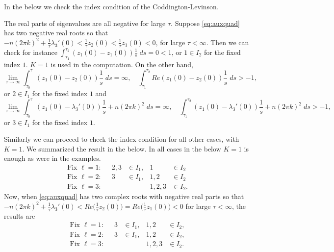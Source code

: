 \documentclass[a4paper,11pt]{article}
\theoremstyle{remark}
\begin{document}

In the below we check the index condition of the Coddington-Levinson. 

 The real parts of eigenvalues are all negative for large $\tau$. Suppose \eqref{eq:auxquad} has two negative real roots so that  $-n(2\pi k)^2 + \frac{1}{\tau}\lambda_3'(0)<\frac{1}{\tau}z_2(0)<\frac{1}{\tau}z_1(0)<0$, for large $\tau<\infty$.  Then we can check for instance
$\displaystyle\int_{\tau_1}^{\tau_2} (z_1(0)-z_1(0))\frac{1}{s} \; ds = 0< 1$,
or $1\in I_2$ for the fixed index $1$. $K=1$ is used in the computation. On the other hand,
$$ \lim_{\tau \rightarrow \infty}\int_{\tau_0}^\tau (z_1(0)-z_2(0))\frac{1}{s} \; ds = \infty, \quad  \int_{\tau_1}^{\tau_2} Re (z_1(0)-z_2(0))\frac{1}{s} \; ds > -1,$$
or $2\in I_1$ for the fixed index $1$ and
$$ \lim_{\tau \rightarrow \infty}\int_{\tau_0}^\tau (z_1(0)-\lambda_3'(0))\frac{1}{s} + n(2\pi k)^2 \; ds =\infty, \quad  \int_{\tau_1}^{\tau_2} (z_1(0)-\lambda_3'(0))\frac{1}{s} + n(2\pi k)^2 \; ds > -1,$$
or $3\in I_1$ for the fixed index $1$.

 Similarly we can proceed to check the index condition for all other cases, with $K=1$.
We summarized the result in the below. In all cases in the below $K=1$ is enough as were in the examples.
\begin{align*}
  \text{Fix $\ell=1$:}&& 2,3&\in I_1, & 1&\in I_2\\
  \text{Fix $\ell=2$:}&& 3&\in I_1, & 1,2&\in I_2\\
  \text{Fix $\ell=3$:}&& & & 1,2,3&\in I_2.
\end{align*}
Now, when \eqref{eq:auxquad} has two complex roots with negative real parts so that $-n(2\pi k)^2 + \frac{1}{\tau}\lambda_3'(0)<Re\Big(\frac{1}{\tau}z_2(0)\Big)=Re\Big(\frac{1}{\tau}z_1(0)\Big)<0$ for large $\tau<\infty$, the results are
\begin{align*}
  \text{Fix $\ell=1$:}&& 3&\in I_1, & 1,2&\in I_2,\\
  \text{Fix $\ell=2$:}&& 3&\in I_1, & 1,2&\in I_2,\\
  \text{Fix $\ell=3$:}&& & & 1,2,3&\in I_2.
\end{align*}


\end{document}
